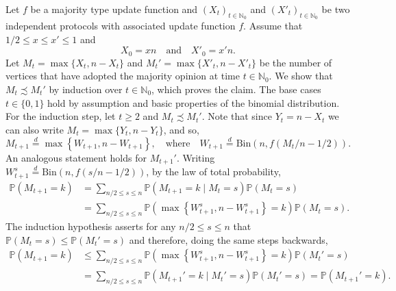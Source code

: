 \documentclass[11pt]{article}
\newcommand{\Prob}{\mathbb{P}}
\numberwithin{theorem}{section}
\begin{document}
Let $f$ be a majority type update function and $(X_t)_{t \in\mathbb{N}_0}$ and $(X'_t)_{t \in\mathbb{N}_0}$ be two independent protocols with associated update function $f$. Assume that $1/2 \leq x\leq x'\leq 1$ and
\[
 X_0 = xn 
 \quad\text{and}\quad
 X'_0= x'n.
\]
Let $M_t = \max\{X_t,n-X_t\}$ and $M_t' = \max\{X'_t,n-X'_t\}$ be the number of vertices that have adopted the majority opinion at time $t\in\mathbb{N}_0$.
We show that $M_t \precsim M_t'$ by induction over $t \in \mathbb{N}_0$, which proves the claim. The base cases $t\in\{0,1\}$ hold by assumption and basic properties of the binomial distribution.
For the induction step, let $t\geq 2$ and $M_t \precsim M_t'$. Note that since $Y_t = n-X_t$ we can also write $M_t = \max\{Y_t, n-Y_t\}$, and so,
\[
    M_{t+1} \stackrel{d}{=} \max\left\{W_{t+1},n-W_{t+1}\right\},
    \quad \text{where}\quad
    W_{t+1} \stackrel{d}{=}\text{Bin}(n,f(M_t/n-1/2)).
\]
An analogous statement holds for $M_{t+1}'$. 
Writing $W_{t+1}^s\stackrel{d}{=}\text{Bin}(n,f(s/n-1/2))$, by the law of total probability, 
\begin{align*}
\Prob(M_{t+1} = k) &=\sum_{n/2 \le s \le n}\Prob(M_{t+1} = k \mid M_t=s)\Prob(M_t=s) \\&=\sum_{n/2 \le s \le n}\Prob(\max\left\{ W_{t+1}^s,n- W_{t+1}^s\right\} = k )\Prob(M_t=s).
\end{align*}
The induction hypothesis asserts for any $n/2 \le s \le n$ that $\Prob(M_t=s)\leq \Prob(M_t'=s)$ and therefore, doing the same steps backwards,
\begin{align*}
\Prob(M_{t+1} = k) &\leq \sum_{n/2 \le s \le n}\Prob(\max\left\{ W_{t+1}^s,n- W_{t+1}^s\right\} = k )\Prob(M_t'=s) \\
&= \sum_{n/2 \le s \le n}\Prob(M_{t+1}' = k \mid M_t'=s)\Prob(M_t'=s) =\Prob(M_{t+1}' = k).
\end{align*}
\end{document}
